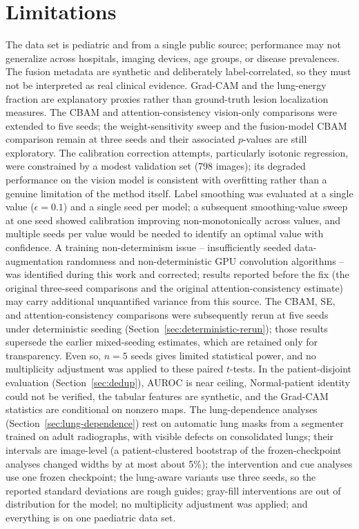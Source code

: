 \documentclass[11pt,a4paper]{article}
\begin{document}
\section{Limitations}
The data set is pediatric and from a single public source; performance may
not generalize across hospitals, imaging devices, age groups, or disease
prevalences. The fusion metadata are synthetic and deliberately
label-correlated, so they must not be interpreted as real clinical evidence.
Grad-CAM and the lung-energy fraction are explanatory proxies rather than
ground-truth lesion localization measures. The CBAM and attention-consistency
vision-only comparisons were extended to five seeds; the weight-sensitivity
sweep and the fusion-model CBAM comparison remain at three seeds and their
associated $p$-values are still exploratory. The calibration correction
attempts, particularly isotonic regression, were constrained by a modest
validation set (798 images); its degraded performance on the vision model is
consistent with overfitting rather than a genuine limitation of the method
itself. Label smoothing was evaluated at a single value ($\epsilon=0.1$) and
a single seed per model; a subsequent smoothing-value sweep at one seed
showed calibration improving non-monotonically across values, and multiple
seeds per value would be needed to identify an optimal value with
confidence. A training non-determinism issue -- insufficiently seeded
data-augmentation randomness and non-deterministic GPU convolution
algorithms -- was identified during this work and corrected; results
reported before the fix (the original three-seed comparisons and the
original attention-consistency estimate) may carry additional unquantified
variance from this source. The CBAM, SE, and attention-consistency comparisons
were subsequently rerun at five seeds under deterministic seeding
(Section~\ref{sec:deterministic-rerun}); those results supersede the earlier
mixed-seeding estimates, which are retained only for transparency. Even so,
$n=5$ seeds gives limited statistical power, and no multiplicity adjustment
was applied to these paired $t$-tests. In the patient-disjoint evaluation
(Section~\ref{sec:dedup}), AUROC is near ceiling, Normal-patient identity could
not be verified, the tabular features are synthetic, and the Grad-CAM statistics
are conditional on nonzero maps. The lung-dependence analyses
(Section~\ref{sec:lung-dependence}) rest on automatic lung masks from a
segmenter trained on adult radiographs, with visible defects on consolidated
lungs; their intervals are image-level (a patient-clustered bootstrap of the
frozen-checkpoint analyses changed widths by at most about 5\%); the
intervention and cue analyses use one frozen checkpoint; the lung-aware variants
use three seeds, so the reported standard deviations are rough guides; gray-fill
interventions are out of distribution for the model; no multiplicity adjustment
was applied; and everything is on one paediatric data set.
\end{document}
